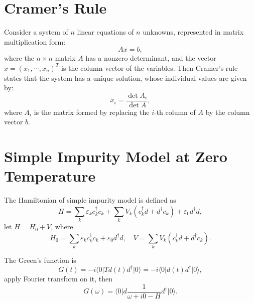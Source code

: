 \documentclass{book}
\newcommand{\bra}[1]{{\langle#1|}}
\newcommand{\ket}[1]{{|#1\rangle}}
\numberwithin{equation}{section}
\begin{document}
\section{Cramer's Rule}
Consider a system of $n$ linear equations of $n$ unknowns, represented in 
matrix multiplication form:
\begin{equation}
  Ax=b,
\end{equation}
where the $n\times n$ matrix $A$ has a nonzero determinant, and the
vector $x=(x_1,\cdots,x_n)^T$ is the column vector of the variables.
Then Cramer's rule states that the system has a unique solution, whose
individual values are given by:
\begin{equation}
  x_i=\frac{\det A_i}{\det A},
\end{equation}
where $A_i$ is the matrix formed by replacing the $i$-th column of $A$
by the column vector $b$.



\section{Simple Impurity Model at Zero Temperature}
The Hamiltonian of simple impurity model is defined as
\begin{equation}
  H=\sum_k\varepsilon_kc_k^\dag c_k+\sum_kV_k(c_k^\dag d+d^\dag c_k)
  +\varepsilon_0d^\dag d,
\end{equation}
let $H=H_0+V$, where
\begin{equation}
  H_0=\sum_k\varepsilon_kc_k^\dag c_k+\varepsilon_0d^\dag d,\quad
  V=\sum_kV_k(c_k^\dag d+d^\dag c_k).
\end{equation}

The Green's function is
\begin{equation}
  G(t)=-i\bra{0}Td(t)d^\dag\ket{0}=-i\bra{0}d(t)d^\dag\ket{0},
\end{equation}
apply Fourier transform on it, then
\begin{equation}
  G(\omega)=\bra{0}d\frac{1}{\omega+i0-H}d^\dag\ket{0}.
\end{equation}
\end{document}
